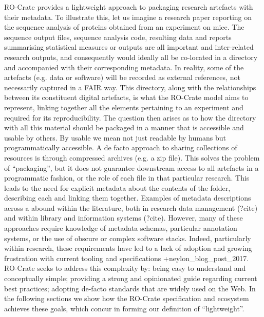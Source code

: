 \markdownRendererInterblockSeparator
{}RO-Crate provides a lightweight approach to packaging research artefacts with their metadata. To illustrate this, let us imagine a research paper reporting on the sequence analysis of proteins obtained from an experiment on mice. The sequence output files, sequence analysis code, resulting data and reports summarising statistical measures or outputs are all important and inter-related research outputs, and consequently would ideally all be co-located in a directory and accompanied with their corresponding metadata. In reality, some of the artefacts (e.g. data or software) will be recorded as external references, not necessarily captured in a FAIR way. This directory, along with the relationships between its constituent digital artefacts, is what the RO-Crate model aims to represent, linking together all the elements pertaining to an experiment and required for its reproducibility. \markdownRendererInterblockSeparator
{}The question then arises as to how the directory with all this material should be packaged in a manner that is accessible and usable by others. By usable we mean not just readable by humans but programmatically accessible. A de facto approach to sharing collections of resources is through compressed archives (e.g. a zip file). This solves the problem of “packaging”, but it does not guarantee downstream access to all artefacts in a programmatic fashion, or the role of each file in that particular research. This leads to the need for explicit metadata about the contents of the folder, describing each and linking them together.\markdownRendererInterblockSeparator
{}Examples of metadata descriptions across a  abound within the literature, both in research data management (?cite) and within library and information systems (?cite). However, many of these approaches require knowledge of metadata schemas, particular annotation systems, or the use of obscure or complex software stacks. Indeed, particularly within research, these requirements have led to a lack of adoption and growing frustration with current tooling and specifications +{}{}{neylon_blog_post_2017}.\markdownRendererInterblockSeparator
{}RO-Crate seeks to address this complexity by:\markdownRendererInterblockSeparator
{}\markdownRendererOlBeginTight
{}being easy to understand and conceptually simple;\markdownRendererOlItemEnd 
{}providing a strong and opinionated guide regarding current best practices;\markdownRendererOlItemEnd 
{}adopting de-facto standards that are widely used on the Web.\markdownRendererOlItemEnd 
\markdownRendererOlEndTight \markdownRendererInterblockSeparator
{}In the following sections we show how the RO-Crate specification and ecosystem achieves these goals, which concur in forming our definition of “lightweight”. \relax